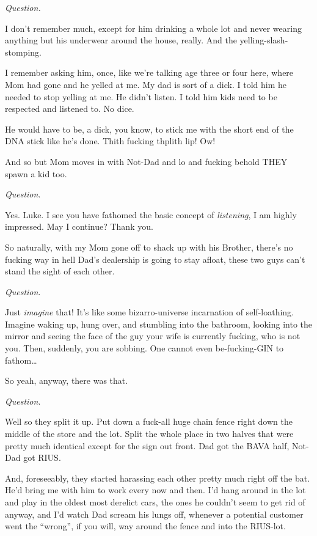 {\em Question.}



I don't remember much, except for him drinking a whole lot
and never wearing anything but his underwear around the house,
really. And the yelling-slash-stomping.

I remember asking him, once, like we're talking age three or
four here, where Mom had gone and he yelled at me. My dad is sort
of a dick. I told him he needed to stop yelling at me. He
didn't listen. I told him kids need to be respected and
listened to. No dice.

He would have to be, a dick, you know, to stick me with the short
end of the DNA stick like he's done. Thith fucking thplith
lip! Ow!

And so but Mom moves in with Not-Dad and lo and fucking behold THEY
spawn a kid too.



{\em Question}.



Yes. Luke. I see you have fathomed the basic concept of
{\em listening}, I am highly impressed. May I continue? Thank
you.

So naturally, with my Mom gone off to shack up with his Brother,
there's no fucking way in hell Dad's dealership is going to
stay afloat, these two guys can't stand the sight of each
other.



{\em Question}.



Just {\em imagine} that! It's like some bizarro-universe
incarnation of self-loathing. Imagine waking up, hung over, and
stumbling into the bathroom, looking into the mirror and seeing the
face of the guy your wife is currently fucking, who is not you.
Then, suddenly, you are sobbing. One cannot even be-fucking-GIN to
fathom{\ldots}

So yeah, anyway, there was that.



{\em Question}.



Well so they split it up. Put down a fuck-all huge chain fence
right down the middle of the store and the lot. Split the whole
place in two halves that were pretty much identical except for the
sign out front. Dad got the BAVA half, Not-Dad got RIUS.

And, foreseeably, they started harassing each other pretty much
right off the bat. He'd bring me with him to work every now
and then. I'd hang around in the lot and play in the oldest
most derelict cars, the ones he couldn't seem to get rid of
anyway, and I'd watch Dad scream his lungs off, whenever a
potential customer went the ``wrong'', if you will, way
around the fence and into the RIUS-lot.



